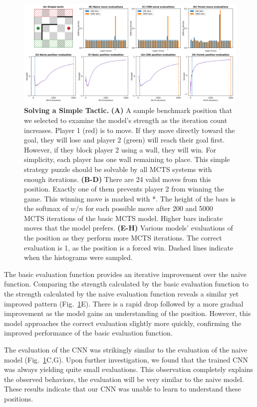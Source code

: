 \documentclass[10pt]{article}
\begin{document}
\begin{figure}[H]
    \centering
    \includegraphics[width=\linewidth]{MCTS_eval.png}
    \caption{\textbf{Solving a Simple Tactic.} \textbf{(A)} A sample benchmark position that we selected to examine the model's strength as the iteration count increases. Player 1 (red) is to move. If they move directly toward the goal, they will lose and player 2 (green) will reach their goal first. However, if they block player 2 using a wall, they will win. For simplicity, each player has one wall remaining to place. This simple strategy puzzle should be solvable by all MCTS systems with enough iterations. \textbf{(B-D)} There are 24 valid moves from this position. Exactly one of them prevents player 2 from winning the game. This winning move is marked with *. The height of the bars is the softmax of $w/n$ for each possible move after 200 and 5000 MCTS iterations of the basic MCTS model. Higher bars indicate moves that the model prefers. \textbf{(E-H)} Various models' evaluations of the position as they perform more MCTS iterations. The correct evaluation is 1, as the position is  a forced win. Dashed lines indicate when the histograms were sampled.}
    \label{fig:MCTS}
\end{figure}

The basic evaluation function provides an iterative improvement over the naive function. Comparing the strength calculated by the basic evaluation function to the strength calculated by the naive evaluation function reveals a similar yet improved pattern (Fig.~\ref{fig:MCTS}E). There is a rapid drop followed by a more gradual improvement as the model gains an understanding of the position. However, this model approaches the correct evaluation slightly more quickly, confirming the improved performance of the basic evaluation function.

The evaluation of the CNN was strikingly similar to the evaluation of the naive model (Fig.~\ref{fig:MCTS}C,G). Upon further investigation, we found that the trained CNN was always yielding quite small evaluations. This observation completely explains the observed behaviors, the evaluation will be very similar to the naive model. These results indicate that our CNN was unable to learn to understand these positions.
\end{document}
